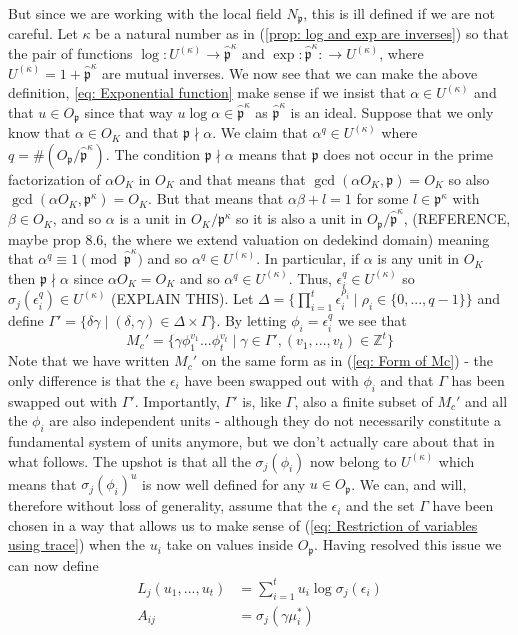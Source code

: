 \documentclass{article}
\newcommand{\mfrak}[1]{\mathfrak{#1}}
\newcommand{\mbb}[1]{\mathbb{#1}}
\begin{document}
But since we are working with the local field $N_\mfrak p$, this is ill defined if we are not careful. Let $\kappa$ be a natural number as in (\ref{prop: log and exp are inverses}) so that the pair of functions $\log : U^{(\kappa)} \to \hat {\mfrak p}^\kappa$ 
and $\exp : \hat {\mfrak p}^\kappa : \to U^{(\kappa)}$, where $U^{(\kappa)} = 1 + \hat {\mfrak p}^\kappa$ are mutual inverses. We now see that we can make the above definition, \ref{eq: Exponential function} make sense if we insist that $\alpha \in U^{(\kappa)}$ and that $u \in O_\mfrak p$ since that way $u \log \alpha \in \hat {\mfrak p}^\kappa$ as $\hat {\mfrak p}^\kappa$ is an ideal. Suppose that we only know that $\alpha \in O_K$ and that $\mfrak p \nmid \alpha$. We claim that $\alpha^q \in U^{(\kappa)}$ where 
$q = \# (O_\mfrak p / \hat {\mfrak p}^\kappa)$. The condition $\mfrak p \nmid \alpha$ means that $\mfrak p$ does not occur in the prime factorization of 
$\alpha O_K$ in $O_K$ and that means that $\gcd(\alpha O_K, \mfrak p) = O_K$ so also 
$\gcd(\alpha O_K, \mfrak p^\kappa) = O_K$. But that means that $\alpha \beta + l = 1$ for some 
$l \in \mfrak p^\kappa$ with $\beta \in O_K$, and so $\alpha$ is a unit in $O_K / \mfrak p^\kappa$ so it is also a unit in $O_\mfrak p / \hat {\mfrak p}^\kappa$, (REFERENCE, maybe prop 8.6, the where we extend valuation on dedekind domain) meaning that $\alpha^q \equiv 1 \pmod {\hat{\mfrak p}^\kappa}$ and so $\alpha^q \in U^{(\kappa)}$. In particular, if $\alpha$ is any unit in $O_K$ then $\mfrak p \nmid \alpha$ since $\alpha O_K = O_K$ and so $\alpha^q \in U^{(\kappa)}$. Thus, $\epsilon_i^q \in U^{(\kappa)}$ so $\sigma_j(\epsilon_i^q) \in U^{(\kappa)}$ (EXPLAIN THIS). 
Let $\Delta = \{\prod_{i = 1}^t \epsilon_i^{\rho_i} \mid \rho_i \in \{0, ..., q-1 \} \}$ and define
$\Gamma' = \{\delta \gamma \mid (\delta, \gamma) \in \Delta \times \Gamma \}$. By
letting $\phi_i = \epsilon_i^q$ we see that
$$M_c' = \{\gamma \phi_1^{v_1}...\phi_t^{v_t} \mid \gamma \in \Gamma', (v_1, ..., v_t)\in \mbb Z^t  \}$$
Note that we have written $M_c'$ on the same form as in (\ref{eq: Form of Mc}) - the only difference is that the $\epsilon_i$ have been swapped out with $\phi_i$ and that $\Gamma$ has been swapped out with $\Gamma'$. Importantly, $\Gamma'$ is, like $\Gamma$, also a finite subset of $M_c'$ and all the $\phi_i$ are also independent units - although they do not necessarily constitute a fundamental system of units anymore, but we don't actually care about that in what follows. The upshot is that all the $\sigma_j(\phi_i)$ now belong to $U^{(\kappa)}$ which means that $\sigma_j(\phi_i)^u$ is now well defined for any $u \in O_\mfrak p$. We can, and will, therefore without loss of generality, assume that the $\epsilon_i$ and the set $\Gamma$ have been chosen in a way that allows us to make sense of (\ref{eq: Restriction of variables using trace}) when the $u_i$ take on values inside $O_\mfrak p$. Having resolved this issue we can now define
\begin{align*}
    L_j(u_1, ..., u_t) &= \sum_{i = 1}^{t} u_i \log \sigma_j(\epsilon_i) \\
    A_{ij} &= \sigma_j(\gamma \mu_i^*)
\end{align*}
\end{document}
